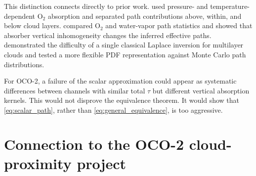 \documentclass[11pt]{article}
\begin{document}
This distinction connects directly to prior work.  \citet{scholl2006} used
pressure- and temperature-dependent O$_2$ absorption and separated path
contributions above, within, and below cloud layers.  \citet{min2004} compared
O$_2$ and water-vapor path statistics and showed that absorber vertical
inhomogeneity changes the inferred effective paths.  \citet{bennartz2006}
demonstrated the difficulty of a single classical Laplace inversion for
multilayer clouds and tested a more flexible PDF representation against Monte
Carlo path distributions.

For OCO-2, a failure of the scalar approximation could appear as systematic
differences between channels with similar total $\tau$ but different vertical
absorption kernels.  This would not disprove the equivalence theorem.  It would
show that \cref{eq:scalar_path}, rather than
\cref{eq:general_equivalence}, is too aggressive.

\section{Connection to the OCO-2 cloud-proximity project}
\end{document}
